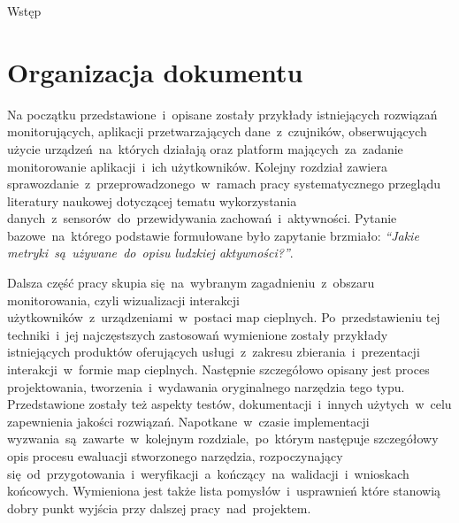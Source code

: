 \begin{chapter}{Wstęp}
	\section{Organizacja dokumentu}
	Na początku przedstawione~i~opisane zostały przykłady istniejących rozwiązań monitorujących, aplikacji przetwarzających dane~z~czujników, obserwujących użycie urządzeń~na~których działają oraz platform mających~za~zadanie monitorowanie aplikacji~i~ich użytkowników. Kolejny rozdział zawiera sprawozdanie~z~przeprowadzonego~w~ramach pracy systematycznego przeglądu literatury naukowej dotyczącej tematu wykorzystania danych~z~sensorów~do~przewidywania zachowań~i~aktywności. Pytanie bazowe~na~którego podstawie formułowane było zapytanie brzmiało: {\it ``Jakie metryki~są~używane~do~opisu ludzkiej aktywności?''}. 
	
	Dalsza część pracy skupia się~na~wybranym zagadnieniu~z~obszaru monitorowania, czyli wizualizacji interakcji użytkowników~z~urządzeniami~w~postaci map cieplnych. Po~przedstawieniu tej techniki~i~jej najczęstszych zastosowań wymienione zostały przykłady istniejących produktów oferujących usługi~z~zakresu zbierania~i~prezentacji interakcji~w~formie map cieplnych. Następnie szczegółowo opisany jest proces projektowania, tworzenia~i~wydawania oryginalnego narzędzia tego typu. Przedstawione zostały też aspekty testów, dokumentacji~i~innych użytych~w~celu zapewnienia jakości rozwiązań. Napotkane~w~czasie implementacji wyzwania~są~zawarte~w~kolejnym rozdziale,~po~którym następuje szczegółowy opis procesu ewaluacji stworzonego narzędzia, rozpoczynający się~od~przygotowania~i~weryfikacji~a~kończący~na~walidacji~i~wnioskach końcowych. Wymieniona jest także lista pomysłów~i~usprawnień które stanowią dobry punkt wyjścia przy dalszej pracy~nad~projektem.
\end{chapter}
